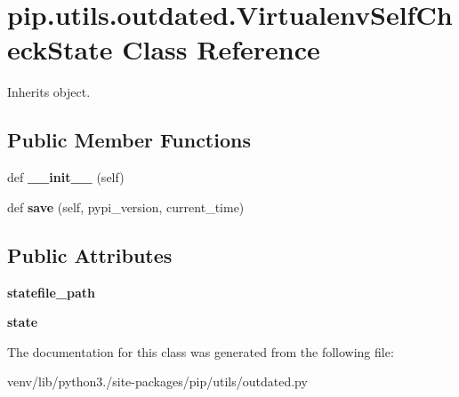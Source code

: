 \hypertarget{classpip_1_1utils_1_1outdated_1_1_virtualenv_self_check_state}{}\section{pip.\+utils.\+outdated.\+Virtualenv\+Self\+Check\+State Class Reference}
\label{classpip_1_1utils_1_1outdated_1_1_virtualenv_self_check_state}


Inherits object.

\subsection*{Public Member Functions}
\begin{DoxyCompactItemize}
\item 
\mbox{\label{classpip_1_1utils_1_1outdated_1_1_virtualenv_self_check_state_acc7b59ba7f49fde7235cabf02a20c079}} 
def {\bfseries \+\_\+\+\_\+init\+\_\+\+\_\+} (self)
\item 
\mbox{\label{classpip_1_1utils_1_1outdated_1_1_virtualenv_self_check_state_a4c28190c4979586ce6a0232960373e88}} 
def {\bfseries save} (self, pypi\+\_\+version, current\+\_\+time)
\end{DoxyCompactItemize}
\subsection*{Public Attributes}
\begin{DoxyCompactItemize}
\item 
\mbox{\label{classpip_1_1utils_1_1outdated_1_1_virtualenv_self_check_state_a35ae68c8d8a851a7e415025924ebe83e}} 
{\bfseries statefile\+\_\+path}
\item 
\mbox{\label{classpip_1_1utils_1_1outdated_1_1_virtualenv_self_check_state_a3b3324348a73237750fc13cdeb14b35d}} 
{\bfseries state}
\end{DoxyCompactItemize}


The documentation for this class was generated from the following file\+:\begin{DoxyCompactItemize}
\item 
venv/lib/python3./site-\/packages/pip/utils/outdated.\+py\end{DoxyCompactItemize}
